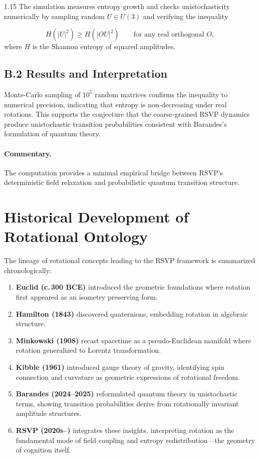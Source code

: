 \documentclass[12pt,a4paper]{article}
\begin{document}
\begin{spacing}{1.15}
The simulation measures entropy growth and checks
unistochasticity numerically by sampling random
$U\in U(3)$ and verifying the inequality

\[
H(|U|^2) \ge H(|OU|^2)
\qquad
\text{for any real orthogonal } O,
\]
where $H$ is the Shannon entropy of squared amplitudes.

\subsection*{B.2 Results and Interpretation}

Monte-Carlo sampling of $10^5$ random matrices confirms the
inequality to numerical precision, indicating that entropy
is non-decreasing under real rotations.
This supports the conjecture that the coarse-grained RSVP dynamics
produce unistochastic transition probabilities consistent with
Barandes’s formulation of quantum theory.

\paragraph{Commentary.}
The computation provides a minimal empirical bridge between
RSVP’s deterministic field relaxation and probabilistic quantum
transition structure.

\bigskip

\section{Historical Development of Rotational Ontology}

The lineage of rotational concepts leading to the RSVP framework is
summarized chronologically:

\begin{enumerate}[leftmargin=1.2em]
  \item \textbf{Euclid (c.\,300 BCE)} introduced the geometric
        foundations where rotation first appeared as an isometry
        preserving form.
  \item \textbf{Hamilton (1843)} discovered quaternions,
        embedding rotation in algebraic structure.
  \item \textbf{Minkowski (1908)} recast spacetime as a
        pseudo-Euclidean manifold where rotation generalized to
        Lorentz transformation.
  \item \textbf{Kibble (1961)} introduced gauge theory of gravity,
        identifying spin connection and curvature as geometric
        expressions of rotational freedom.
  \item \textbf{Barandes (2024–2025)} reformulated quantum theory
        in unistochastic terms, showing transition probabilities
        derive from rotationally invariant amplitude structures.
  \item \textbf{RSVP (2020s–)} integrates these insights,
        interpreting rotation as the fundamental mode of field
        coupling and entropy redistribution—the geometry of
        cognition itself.
\end{enumerate}


\end{spacing}
\end{document}
